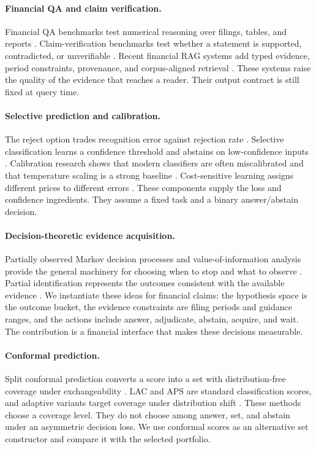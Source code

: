 \documentclass[11pt]{article}
\begin{document}
\paragraph{Financial QA and claim verification.}
Financial QA benchmarks test numerical reasoning over filings, tables, and reports \citep{chen2021finqa,zhu2021tatqa,islam2023financebench,liu2024finben}. Claim-verification benchmarks test whether a statement is supported, contradicted, or unverifiable \citep{zhao2024findver,rangapur2025finfact}. Recent financial RAG systems add typed evidence, period constraints, provenance, and corpus-aligned retrieval \citep{mansouri2026finrank,jiang2026finrate,chen2026hcrag,chi2026finsagent}. These systems raise the quality of the evidence that reaches a reader. Their output contract is still fixed at query time.

\paragraph{Selective prediction and calibration.}
The reject option trades recognition error against rejection rate \citep{chow1970optimum}. Selective classification learns a confidence threshold and abstains on low-confidence inputs \citep{geifman2017selective}. Calibration research shows that modern classifiers are often miscalibrated and that temperature scaling is a strong baseline \citep{guo2017calibration}. Cost-sensitive learning assigns different prices to different errors \citep{elkan2001cost}. These components supply the loss and confidence ingredients. They assume a fixed task and a binary answer/abstain decision.

\paragraph{Decision-theoretic evidence acquisition.}
Partially observed Markov decision processes and value-of-information analysis provide the general machinery for choosing when to stop and what to observe \citep{krishnamurthy2017pomdp}. Partial identification represents the outcomes consistent with the available evidence \citep{manski2003partial}. We instantiate these ideas for financial claims: the hypothesis space is the outcome bucket, the evidence constraints are filing periods and guidance ranges, and the actions include answer, adjudicate, abstain, acquire, and wait. The contribution is a financial interface that makes these decisions measurable.

\paragraph{Conformal prediction.}
Split conformal prediction converts a score into a set with distribution-free coverage under exchangeability \citep{vovk2005algorithmic,angelopoulos2021gentle}. LAC and APS are standard classification scores, and adaptive variants target coverage under distribution shift \citep{romano2020classification,gibbs2021adaptive}. These methods choose a coverage level. They do not choose among answer, set, and abstain under an asymmetric decision loss. We use conformal scores as an alternative set constructor and compare it with the selected portfolio.
\end{document}
